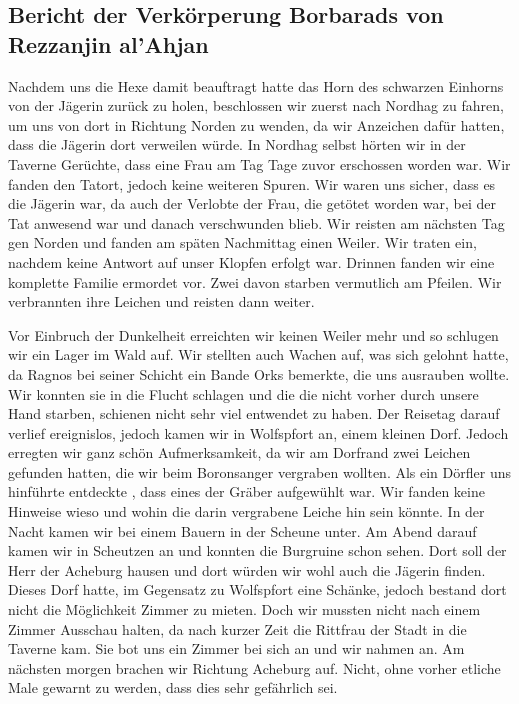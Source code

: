 \subsection{Bericht der Verkörperung Borbarads von Rezzanjin al'Ahjan}
Nachdem uns die Hexe damit beauftragt hatte das Horn des schwarzen Einhorns von der Jägerin zurück zu holen, beschlossen wir zuerst nach Nordhag zu fahren, um uns von dort in Richtung Norden zu wenden, da wir Anzeichen dafür hatten, dass die Jägerin dort verweilen würde. In Nordhag selbst hörten wir in der Taverne Gerüchte, dass eine Frau am Tag Tage zuvor erschossen worden war. Wir fanden den Tatort, jedoch keine weiteren Spuren. Wir waren uns sicher, dass es die Jägerin war, da auch der Verlobte der Frau, die getötet worden war, bei der Tat anwesend war und danach verschwunden blieb. Wir reisten am nächsten Tag gen Norden und fanden am späten Nachmittag einen Weiler. Wir traten ein, nachdem keine Antwort auf unser Klopfen erfolgt war. Drinnen fanden wir eine komplette Familie ermordet vor. Zwei davon starben vermutlich am Pfeilen. Wir verbrannten ihre Leichen und reisten dann weiter. 


Vor Einbruch der Dunkelheit erreichten wir keinen Weiler mehr und so schlugen wir ein Lager im Wald auf. Wir stellten auch Wachen auf, was sich gelohnt hatte, da Ragnos bei seiner Schicht ein Bande Orks bemerkte, die uns ausrauben wollte. Wir konnten sie in die Flucht schlagen und die die nicht vorher durch unsere Hand starben, schienen nicht sehr viel entwendet zu haben. Der Reisetag darauf verlief ereignislos, jedoch kamen wir in Wolfspfort an, einem kleinen Dorf. Jedoch erregten wir ganz schön Aufmerksamkeit, da wir am Dorfrand zwei Leichen gefunden hatten, die wir beim Boronsanger vergraben wollten. Als ein Dörfler uns hinführte entdeckte , dass eines der Gräber aufgewühlt war. Wir fanden keine Hinweise wieso und wohin die darin vergrabene Leiche hin sein könnte. In der Nacht kamen wir bei einem Bauern in der Scheune unter. Am Abend darauf kamen wir in Scheutzen an und konnten die Burgruine schon sehen. Dort soll der Herr der Acheburg hausen und dort würden wir wohl auch die Jägerin finden. Dieses Dorf hatte, im Gegensatz zu Wolfspfort eine Schänke, jedoch bestand dort nicht die Möglichkeit Zimmer zu mieten. Doch wir mussten nicht nach einem Zimmer Ausschau halten, da nach kurzer Zeit die Rittfrau der Stadt in die Taverne kam. Sie bot uns ein Zimmer bei sich an und wir nahmen an.
Am nächsten morgen brachen wir Richtung Acheburg auf. Nicht, ohne vorher etliche Male gewarnt zu werden, dass dies sehr gefährlich sei.

